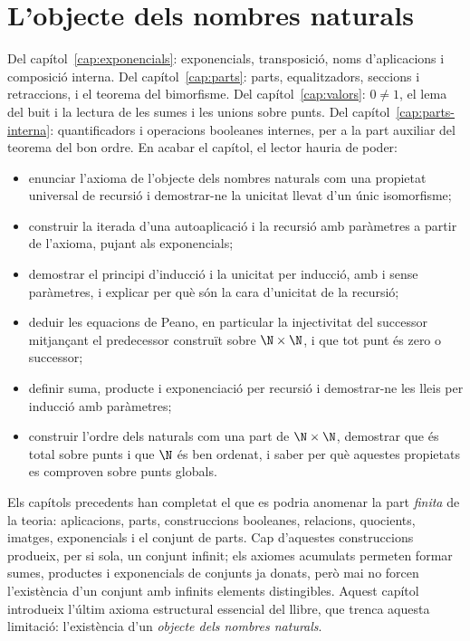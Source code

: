 \chapter{L'objecte dels nombres naturals}\label{cap:naturals}

\begin{objectius}
 Del capítol~\ref{cap:exponencials}: exponencials, transposició, noms d'aplicacions i composició interna. Del capítol~\ref{cap:parts}: parts, equalitzadors, seccions i retraccions, i el teorema del bimorfisme. Del capítol~\ref{cap:valors}: \(0\ne1\), el lema del buit i la lectura de les sumes i les unions sobre punts. Del capítol~\ref{cap:parts-interna}: quantificadors i operacions booleanes internes, per a la part auxiliar del teorema del bon ordre.
 En acabar el capítol, el lector hauria de poder:
\begin{itemize}
  \item enunciar l'axioma de l'objecte dels nombres naturals com una propietat universal de recursió i demostrar-ne la unicitat llevat d'un únic isomorfisme;
  \item construir la iterada d'una autoaplicació i la recursió amb paràmetres a partir de l'axioma, pujant als exponencials;
  \item demostrar el principi d'inducció i la unicitat per inducció, amb i sense paràmetres, i explicar per què són la cara d'unicitat de la recursió;
  \item deduir les equacions de Peano, en particular la injectivitat del successor mitjançant el predecessor construït sobre \(\N\times\N\), i que tot punt és zero o successor;
  \item definir suma, producte i exponenciació per recursió i demostrar-ne les lleis per inducció amb paràmetres;
  \item construir l'ordre dels naturals com una part de \(\N\times\N\), demostrar que és total sobre punts i que \(\N\) és ben ordenat, i saber per què aquestes propietats es comproven sobre punts globals.
\end{itemize}
\end{objectius}

Els capítols precedents han completat el que es podria anomenar la part
\emph{finita} de la teoria: aplicacions, parts, construccions booleanes,
relacions, quocients, imatges, exponencials i el conjunt de parts. Cap
d'aquestes construccions produeix, per si sola, un conjunt infinit; els
axiomes acumulats permeten formar sumes, productes i exponencials de
conjunts ja donats, però mai no forcen l'existència d'un conjunt amb
infinits elements distingibles. Aquest capítol introdueix l'últim axioma
estructural essencial del llibre, que trenca aquesta limitació:
l'existència d'un \emph{objecte dels nombres naturals}.

